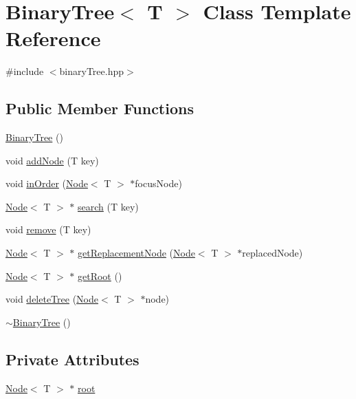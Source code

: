 \hypertarget{classBinaryTree}{}\section{Binary\+Tree$<$ T $>$ Class Template Reference}
\label{classBinaryTree}


{\ttfamily \#include $<$binary\+Tree.\+hpp$>$}

\subsection*{Public Member Functions}
\begin{DoxyCompactItemize}
\item 
\hyperlink{classBinaryTree_a9202cce23960faf8f647c6765decccd4}{Binary\+Tree} ()
\item 
void \hyperlink{classBinaryTree_ace861086e9b5510f32d04ad081500463}{add\+Node} (T key)
\item 
void \hyperlink{classBinaryTree_a547a4d22eb7a8f18ca09dd77402d88c6}{in\+Order} (\hyperlink{classNode}{Node}$<$ T $>$ $\ast$focus\+Node)
\item 
\hyperlink{classNode}{Node}$<$ T $>$ $\ast$ \hyperlink{classBinaryTree_a6110ff77e17b9f0db2170c8bead11210}{search} (T key)
\item 
void \hyperlink{classBinaryTree_a86fedb07a87af1b02e3408950c4f9663}{remove} (T key)
\item 
\hyperlink{classNode}{Node}$<$ T $>$ $\ast$ \hyperlink{classBinaryTree_a0055a6962c39301b5def80189be99601}{get\+Replacement\+Node} (\hyperlink{classNode}{Node}$<$ T $>$ $\ast$replaced\+Node)
\item 
\hyperlink{classNode}{Node}$<$ T $>$ $\ast$ \hyperlink{classBinaryTree_af525a78601eba600d880d1cd947a215a}{get\+Root} ()
\item 
void \hyperlink{classBinaryTree_a4653328dc7727b7c32285bb50a10f6c9}{delete\+Tree} (\hyperlink{classNode}{Node}$<$ T $>$ $\ast$node)
\item 
\hyperlink{classBinaryTree_a390c319c0b28b958463851119edb8af3}{$\sim$\+Binary\+Tree} ()
\end{DoxyCompactItemize}
\subsection*{Private Attributes}
\begin{DoxyCompactItemize}
\item 
\hyperlink{classNode}{Node}$<$ T $>$ $\ast$ \hyperlink{classBinaryTree_a2db40f59d96afceb1a005e6d9aef2374}{root}
\end{DoxyCompactItemize}


